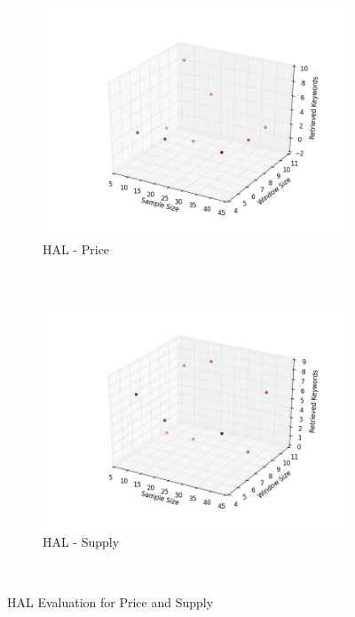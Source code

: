 \begin{figure}[H]
        \centering
        \begin{subfigure}[b]{0.5\textwidth}
                \includegraphics[width=\textwidth]{img/lex/price_hal}
                \caption{HAL - Price}
                \label{fig:al_price}
        \end{subfigure}%
        ~ %
        \begin{subfigure}[b]{0.5\textwidth}
                \includegraphics[width=\textwidth]{img/lex/supply_hal}
                \caption{HAL - Supply}
                \label{fig:hal_supply}
        \end{subfigure}
        ~ %
      
        \caption{HAL Evaluation for Price and Supply}\label{fig:price_supply}
\end{figure}


